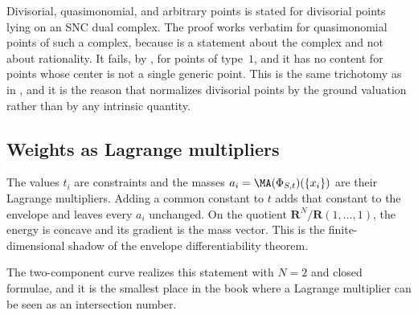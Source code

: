 \begin{warning}{Divisorial, quasimonomial, and arbitrary points}
 is stated for divisorial points lying on an
SNC dual complex.  The proof works verbatim for quasimonomial points of such
a complex, because  is a statement about
the complex and not about rationality.  It fails, by
, for points of type~\(1\), and it has no
content for points whose center is not a single generic point.  This is the
same trichotomy as in , and it is the reason that
 normalizes divisorial points by the ground valuation rather
than by any intrinsic quantity.
\end{warning}

\subsection{Weights as Lagrange multipliers}
\label{sec:ch31-multipliers}

\begin{example}
\label{ex:ch31-lagrange}
The values \(t_i\) are constraints and the masses
\(a_i=\MA(\Phi_{S,t})(\{x_i\})\) are their Lagrange multipliers.  Adding a
common constant to \(t\) adds that constant to the envelope and leaves every
\(a_i\) unchanged.  On the quotient \(\mathbf R^N/\mathbf R(1,\ldots,1)\),
the energy is concave and its gradient is the mass vector.  This is the
finite-dimensional shadow of the envelope differentiability theorem.
\end{example}

The two-component curve realizes this statement with \(N=2\) and closed
formulae, and it is the smallest place in the book where a Lagrange
multiplier can be seen as an intersection number.

